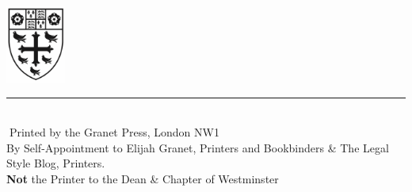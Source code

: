 
\clearpage

\null
\vspace{3in}
\begin{center}
	
\includegraphics[height=1in]{wstmnt.png}
\end{center}

\vfill 

\begin{center}
	\scriptsize\rule{.8\textwidth}{0.4pt}\\Printed by the Granet  Press, London NW1\\
By Self-Appointment to Elijah Granet, Printers and Bookbinders \& The Legal Style Blog, Printers.\\
\textbf{Not} the Printer to the Dean \& Chapter of Westminster\end{center}
